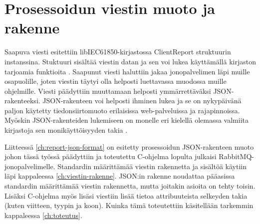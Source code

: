 \section{Prosessoidun viestin muoto ja rakenne}
Saapuva viesti esitettiin libIEC61850-kirjastossa ClientReport struktuurin instanssina. Stuktuuri sisältää viestin datan ja sen voi lukea käyttämällä kirjaston tarjoamia funktioita \cite{libIEC61850-doc}. Saapunut viesti haluttiin jakaa jonopalvelimen läpi muille osapuolille, joten viestin täytyi olla helposti luettavassa muodossa muille ohjelmille. Viesti päädyttiin muuttamaan helposti ymmärrettäväksi JSON-rakenteeksi. JSON-rakenteen voi helposti ihminen lukea ja se on nykypäivänä paljon käytetty tiedonsiirtomuoto erilaisissa web-palveluissa ja rajapinnoissa. Myöskin JSON-rakenteiden lukemiseen on monelle eri kielellä olemassa valmiita kirjastoja sen monikäyttöisyyden takia \cite{Patrizio2016}.

Liitteessä \ref{ch:report-json-format} on esitetty prosessoidun JSON-rakenteen muoto johon tässä työssä päädyttiin ja toteutettu C-ohjelma lopulta julkaisi RabbitMQ-jonopalvelimelle. Standardin määrittämää viestin rakennetta ja sisältöä käytiin läpi kappaleessa \ref{ch:viestin-rakenne}. JSON:in rakenne noudattaa pääasissa standardin määrittämää viestin rakennetta, mutta joitakin asioita on tehty toisin. Lisäksi C-ohjelma myös lisäsi viestiin lisää tietoa attribuuteista selkeyden takia (kuten viitteen, tyypin ja koon). Kuinka tämä toteutettiin käsitellään tarkemmin kappaleessa \ref{ch:toteutus}.

